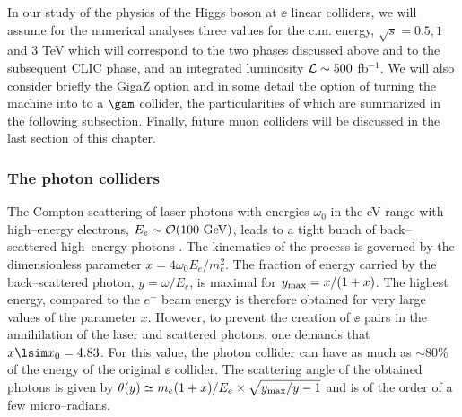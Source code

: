 In our study of the physics of the Higgs boson at $\ee$ linear colliders, we
will assume for the numerical analyses three values for the c.m. energy,
$\sqrt{s}=0.5, 1$ and 3 TeV which will correspond to the two phases discussed
above and to the subsequent CLIC phase, and an integrated luminosity ${\cal L}
\sim 500$ fb$^{-1}$.  We will also consider briefly the GigaZ option and in
some detail the option of turning the machine into to a $\gam$ collider, the
particularities of which are summarized in the following subsection. Finally,
future muon colliders will be discussed in the last section of this chapter. 

\subsubsection{The photon colliders}

The Compton scattering of laser photons with energies $\omega_0$ in the eV
range with high--energy electrons, $E_e \sim {\cal O}(100~{\rm GeV})$, leads to
a tight bunch of back--scattered high--energy photons
\cite{gamma-machine1,gamma-machine2}. The kinematics of the process is governed
by the dimensionless parameter $x =4 \omega_0 E_e/ m_e^2$.  The fraction of
energy carried by the back--scattered photon, $y=\omega/E_e$, is maximal for
$y_{\rm max}= x/(1+x)$. The highest energy, compared to the $e^-$ beam energy
is therefore obtained for very large values of the parameter $x$. However, to
prevent the creation of $\ee$ pairs in the annihilation of the laser and
scattered photons, one demands that  $x \lsim x_0=4.83$. For this value, the
photon collider can have as much as $\sim 80$\% of the  energy of the original
$\ee$ collider. The scattering angle of the obtained photons is given by
$\theta(y) \simeq m_e( 1+x)/E_e \times \sqrt{y_{\rm max}/y-1}$ and is of the
order of a few micro--radians. \s

